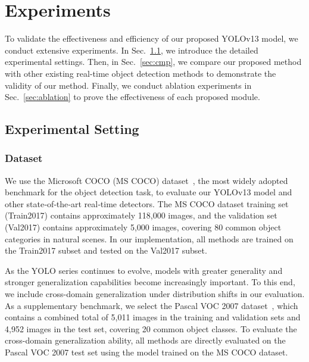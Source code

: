 





\section{Experiments}
To validate the effectiveness and efficiency of our proposed YOLOv13 model, we conduct extensive experiments. In Sec.~\ref{sec:setting}, we introduce the detailed experimental settings. Then, in Sec.~\ref{sec:cmp}, we compare our proposed method with other existing real-time object detection methods to demonstrate the validity of our method. Finally, we conduct ablation experiments in Sec.~\ref{sec:ablation} to prove the effectiveness of each proposed module.

\subsection{Experimental Setting}
\label{sec:setting}
 
\subsubsection{Dataset}
We use the Microsoft COCO (MS COCO) dataset~\cite{mscoco}, the most widely adopted benchmark for the object detection task, to evaluate our YOLOv13 model and other state‐of‐the‐art real‐time detectors. The MS COCO dataset training set (Train2017) contains approximately 118,000 images, and the validation set (Val2017) contains approximately 5,000 images, covering 80 common object categories in natural scenes. In our implementation, all methods are trained on the Train2017 subset and tested on the Val2017 subset.

As the YOLO series continues to evolve, models with greater generality and stronger generalization capabilities become increasingly important. To this end, we include cross-domain generalization under distribution shifts in our evaluation. As a supplementary benchmark, we select the Pascal VOC 2007 dataset~\cite{voc}, which contains a combined total of 5,011 images in the training and validation sets and 4,952 images in the test set, covering 20 common object classes. To evaluate the cross-domain generalization ability, all methods are directly evaluated on the Pascal VOC 2007 test set using the model trained on the MS COCO dataset.


